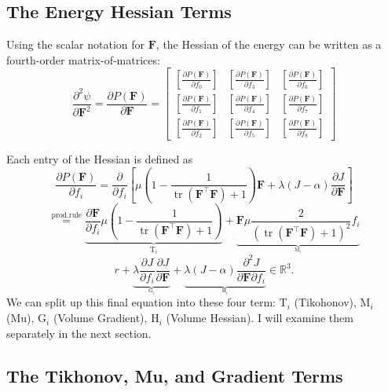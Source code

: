 
\subsection{The Energy Hessian Terms}
Using the scalar notation for $\mathbf{F}$, the Hessian of the energy can be written as a fourth-order matrix-of-matrices:
\[
\frac{\partial^2 \psi}{\partial \mathbf{F}^2} = \frac{\partial P(\mathbf{F})}{\partial \mathbf{F}} = 
\left[\begin{array}{ccc}{\left[\frac{\partial P(\mathbf{F})}{\partial f_0}\right]} & {\left[\frac{\partial P(\mathbf{F})}{\partial f_3}\right]} & {\left[\frac{\partial P(\mathbf{F})}{\partial f_6}\right]} \\ {\left[\frac{\partial P(\mathbf{F})}{\partial f_1}\right]} & {\left[\frac{\partial P(\mathbf{F})}{\partial f_4}\right]} & {\left[\frac{\partial P(\mathbf{F})}{\partial f_7}\right]} \\ {\left[\frac{\partial P(\mathbf{F})}{\partial f_2}\right]} & {\left[\frac{\partial P(\mathbf{F})}{\partial f_5}\right]} & {\left[\frac{\partial P(\mathbf{F})}{\partial f_8}\right]} \end{array}\right]
\]

Each entry of the Hessian is defined as
\[
\frac{\partial P(\mathbf{F})}{\partial f_i} = \frac{\partial}{\partial f_i} \left[ \mu \left( 1 - \frac{1}{\operatorname{tr}(\mathbf{F}^\intercal \mathbf{F}) + 1}\right) \mathbf{F} + \lambda(J-\alpha)\frac{\partial J}{\partial \mathbf{F}} \right]
\]
\[
\stackrel{\text{prod.rule}}{=} \underbrace{\frac{\partial \mathbf{F}}{\partial f_i} \mu \left( 1 - \frac{1}{\operatorname{tr}(\mathbf{F}^\intercal \mathbf{F}) + 1}\right)}_{\mathrm{T}_{i}}  + \underbrace{\mathbf{F} \mu \frac{2}{\left(\operatorname{tr}(\mathbf{F^\intercal}\mathbf{F}) + 1\right)^2} f_i}_{_{\mathrm{M}_{i}}}
\]
\[
r+ \underbrace{\lambda \frac{\partial J}{\partial f_i} \frac{\partial J}{\partial \mathbf{F}}}_{_{\mathrm{G}_{i}}}+ \underbrace{\lambda (J- \alpha) \frac{\partial^2 J}{\partial \mathbf{F}\partial f_i}}_{_{\mathrm{H}_{i}}} \in \mathbb{R}^{3}.
\]
We can split up this final equation into these four term: $\mathrm{T}_i$ (Tikohonov), $\mathrm{M}_i$ (Mu), $\mathrm{G}_i$ (Volume Gradient), $\mathrm{H}_i$ (Volume Hessian). I will examine them separately in the next section.

\subsection{The Tikhonov, Mu, and Gradient Terms}
